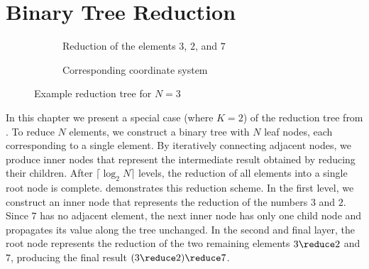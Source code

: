 \chapter{Binary Tree Reduction}
\label{ch:BinaryTreeSummation}

\newcommand{\numLevels}{\lceil \log_2 N \rceil}
\newcommand{\ffs}{\textrm{ffs}}
\newcommand{\nodesum}{\textrm{sum}\,}

\begin{figure}[H]
\centering
\begin{subfigure}{0.45\textwidth}
\centering
{}
\caption{Reduction of the elements $3$, $2$, and $7$}
\label{fig:reductionExample}
\end{subfigure}
\hfill
\begin{subfigure}{0.45\textwidth}
\centering
{}
\caption{Corresponding coordinate system}
\label{fig:coordinateExample}
\end{subfigure}

\caption{Example reduction tree for $N=3$}
\label{fig:reductionAndCoordinateExample}
\end{figure}

In this chapter we present a special case (where $K = 2$) of the reduction tree from .
To reduce $N$ elements, we construct a binary tree with $N$ leaf nodes, each corresponding to a single element.
By iteratively connecting adjacent nodes, we produce inner nodes that represent the intermediate result obtained by reducing their children.
After $\numLevels$ levels, the reduction of all elements into a single root node is complete.
 demonstrates this reduction scheme.
In the first level, we construct an inner node that represents the reduction of the numbers $3$ and $2$.
Since $7$ has no adjacent element, the next inner node has only one child node and propagates its value along the tree unchanged.
In the second and final layer, the root node represents the reduction of the two remaining elements $3 \reduce 2$ and $7$, producing the final result $(3 \reduce 2) \reduce 7$.


